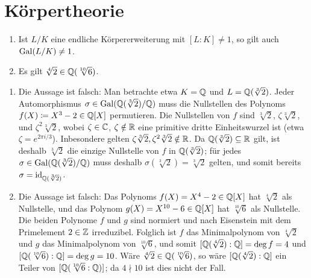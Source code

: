 \section{Körpertheorie}




\begin{question}
  \begin{enumerate}
    \item
      Ist $L/K$ eine endliche Körpererweiterung mit $[L : K] \neq 1$, so gilt auch $\operatorname{Gal}(L/K) \neq 1$.
    \item
      Es gilt $\sqrt[4]{2} \in \mathbb{Q}(\sqrt[10]{6})$.
  \end{enumerate}
\end{question}


\begin{solution}
  \begin{enumerate}
    \item
      Die Aussage ist falsch:
      Man betrachte etwa $K = \mathbb{Q}$ und $L = \mathbb{Q}(\sqrt[3]{2})$.
      Jeder Automorphismus $\sigma \in \operatorname{Gal}(\mathbb{Q}(\sqrt[3]{2})/\mathbb{Q})$ muss die Nullstellen des Polynoms $f(X) \coloneqq X^3-2 \in \mathbb{Q}[X]$ permutieren.
      Die Nullstellen von $f$ sind $\sqrt[3]{2}$, $\zeta \sqrt[3]{2}$, und $\zeta^2 \sqrt[3]{2}$, wobei $\zeta \in \mathbb{C}$, $\zeta \notin \mathbb{R}$ eine primitive dritte Einheitswurzel ist (etwa $\zeta = e^{2 \pi i/3}$).
      Inbesondere gelten $\zeta \sqrt[3]{2}, \zeta^2 \sqrt[3]{2} \notin \mathbb{R}$.
      Da $\mathbb{Q}(\sqrt[3]{2}) \subseteq \mathbb{R}$ gilt, ist deshalb $\sqrt[3]{2}$ die einzige Nullstelle von $f$ in $\mathbb{Q}(\sqrt[3]{2})$;
      für jedes $\sigma \in \operatorname{Gal}(\mathbb{Q}(\sqrt[3]{2})/\mathbb{Q})$ muss deshalb $\sigma(\sqrt[3]{2}) = \sqrt[3]{2}$ gelten, und somit bereits $\sigma = \operatorname{id}_{\mathbb{Q}(\sqrt[3]{2})}$.
    \item
      Die Aussage ist falsch:
      Das Polynoms $f(X) = X^4 - 2 \in \mathbb{Q}[X]$ hat $\sqrt[4]{2}$ als Nullstelle, und das Polynom $g(X) = X^{10} - 6 \in \mathbb{Q}[X]$ hat $\sqrt[10]{6}$ als Nullstelle.
      Die beiden Polynome $f$ und $g$ sind normiert und nach Eisenstein mit dem Primelement $2 \in \mathbb{Z}$ irreduzibel.
      Folglich ist $f$ das Minimalpolynom von $\sqrt[4]{2}$ und $g$ das Minimalpolynom von $\sqrt[10]{6}$, und somit $[\mathbb{Q}(\sqrt[4]{2}) : \mathbb{Q}] = \deg f = 4$ und $[\mathbb{Q}(\sqrt[10]{6}) : \mathbb{Q}] = \deg g = 10$.
      Wäre $\sqrt[4]{2} \in \mathbb{Q}(\sqrt[10]{6})$, so wäre $[\mathbb{Q}(\sqrt[4]{2}) : \mathbb{Q}]$ ein Teiler von $[\mathbb{Q}(\sqrt[10]{6} : \mathbb{Q})]$; da $4 \nmid 10$ ist dies nicht der Fall.
  \end{enumerate}
\end{solution}


